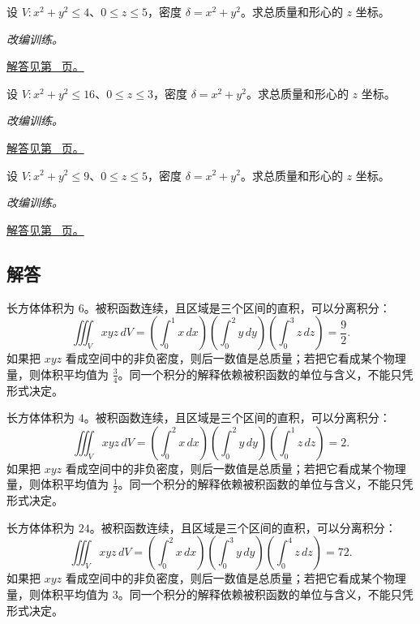 \documentclass[12pt,fontset=fandol]{ctexart}
\begin{document}
\begin{example}[圆柱体内的径向质量]\label{ex:c38q22}
设 $V:x^2+y^2\le 4$、$0\le z\le 5$，密度 $\delta=x^2+y^2$。求总质量和形心的 $z$ 坐标。
\par\textit{改编训练。}\par\hyperref[ans:c38q22]{解答见第~\pageref{ans:c38q22} 页。}
\end{example}
\begin{example}[圆柱体内的径向质量]\label{ex:c38q23}
设 $V:x^2+y^2\le 16$、$0\le z\le 3$，密度 $\delta=x^2+y^2$。求总质量和形心的 $z$ 坐标。
\par\textit{改编训练。}\par\hyperref[ans:c38q23]{解答见第~\pageref{ans:c38q23} 页。}
\end{example}
\begin{example}[圆柱体内的径向质量]\label{ex:c38q24}
设 $V:x^2+y^2\le 9$、$0\le z\le 5$，密度 $\delta=x^2+y^2$。求总质量和形心的 $z$ 坐标。
\par\textit{改编训练。}\par\hyperref[ans:c38q24]{解答见第~\pageref{ans:c38q24} 页。}
\end{example}
\subsection{解答}
\begin{solve}\label{ans:c38q1}
长方体体积为 $6$。被积函数连续，且区域是三个区间的直积，可以分离积分：
\[
\iiint_Vxyz\,dV=\left(\int_0^{1}x\,dx\right)\left(\int_0^{2}y\,dy\right)\left(\int_0^{3}z\,dz\right)=\frac{9}{2}.
\]
如果把 $xyz$ 看成空间中的非负密度，则后一数值是总质量；若把它看成某个物理量，则体积平均值为 $\frac{3}{4}$。同一个积分的解释依赖被积函数的单位与含义，不能只凭形式决定。
\end{solve}

\begin{solve}\label{ans:c38q2}
长方体体积为 $4$。被积函数连续，且区域是三个区间的直积，可以分离积分：
\[
\iiint_Vxyz\,dV=\left(\int_0^{2}x\,dx\right)\left(\int_0^{2}y\,dy\right)\left(\int_0^{1}z\,dz\right)=2.
\]
如果把 $xyz$ 看成空间中的非负密度，则后一数值是总质量；若把它看成某个物理量，则体积平均值为 $\frac{1}{2}$。同一个积分的解释依赖被积函数的单位与含义，不能只凭形式决定。
\end{solve}

\begin{solve}\label{ans:c38q3}
长方体体积为 $24$。被积函数连续，且区域是三个区间的直积，可以分离积分：
\[
\iiint_Vxyz\,dV=\left(\int_0^{2}x\,dx\right)\left(\int_0^{3}y\,dy\right)\left(\int_0^{4}z\,dz\right)=72.
\]
如果把 $xyz$ 看成空间中的非负密度，则后一数值是总质量；若把它看成某个物理量，则体积平均值为 $3$。同一个积分的解释依赖被积函数的单位与含义，不能只凭形式决定。
\end{solve}
\end{document}
